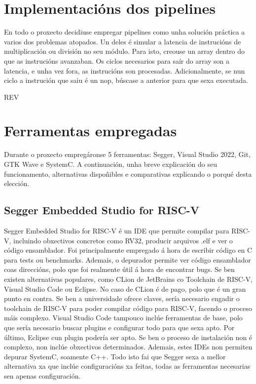 \section{Implementacións dos pipelines}\label{sec:implt_pipelines}
En todo o proxecto decidiuse empregar pipelines como unha solución práctica a varios dos problemas atopados. Un deles é simular a latencia de instrucións de multiplicación ou división no seu módulo. Para isto, creouse un array dentro do que as instrucións avanzaban. Os ciclos necesarios para saír do array son a latencia, e unha vez fora, as instrucións son procesadas. Adicionalmente, se nun ciclo a instrución que saiu é un \acrfull{nop}, búscase a anterior para que sexa executada. 

REV

\section{Ferramentas empregadas}\label{sec:ferramentas}
Durante o proxecto empregáronse 5 ferramentas: Segger, Visual Studio 2022, Git, GTK Wave e SystemC. A continuación, unha breve explicación do seu funcionamento, alternativas dispoñibles e comparativas explicando o porqué desta elección.

\subsection{Segger Embedded Studio for RISC-V}\label{sec:segger}
Segger Embedded Studio for RISC-V é un IDE que permite compilar para RISC-V, incluindo obxectivos concretos como RV32, producir arquivos .elf e ver o código ensamblador. Foi principalmente empregado á hora de escribir código en C para \gls{tests} ou \gls{benchmarks}. Ademais, o depurador permite ver código ensamblador coas direccións, polo que foi realmente útil á hora de encontrar bugs. Se ben existen alternativas populares, como CLion de JetBrains co Toolchain de RISC-V, Visual Studio Code ou Eclipse. No caso de CLion é de pago, polo que é un gran punto en contra. Se ben a universidade ofrece claves, sería necesario engadir o toolchain de RISC-V para poder compilar código para RISC-V, facendo o proceso máis complexo. Visual Studio Code tampouco inclúe ferramentas de base, polo que sería necesario buscar plugins e configurar todo para que sexa apto. Por último, Eclipse cun plugin podería ser apto. Se ben o proceso de instalación non é complexo, non inclúe obxectivos determinados. Ademais, estes IDEs non permiten depurar SystemC, soamente C++. Todo isto fai que Segger sexa a mellor alternativa xa que inclúe configuracións xa feitas, todas as ferramentas necesarias sen apenas configuración.

